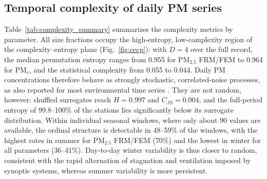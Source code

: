 \documentclass[a4paper,fleqn]{cas-sc}
\begin{document}
\subsection{Temporal complexity of daily PM series}

Table~\ref{tab:complexity_summary} summarizes the complexity metrics by parameter. All size fractions occupy the high-entropy, low-complexity region of the complexity--entropy plane (Fig.~\ref{fig:cecp}): with $D=4$ over the full record, the median permutation entropy ranges from 0.955 for PM$_{2.5}$ FRM/FEM to 0.964 for PM$_{c}$, and the statistical complexity from 0.055 to 0.044. Daily PM concentrations therefore behave as strongly stochastic, correlated-noise processes, as also reported for most environmental time series \citep{Amato2020, Nikolopoulos2021, Ribeiro2017}. They are not random, however: shuffled surrogates reach $H=0.997$ and $C_{JS}=0.004$, and the full-period entropy of 99.8--100\% of the stations lies significantly below its surrogate distribution. Within individual seasonal windows, where only about 90 values are available, the ordinal structure is detectable in 48--59\% of the windows, with the highest rates in summer for PM$_{2.5}$ FRM/FEM (70\%) and the lowest in winter for all parameters (36--41\%). Day-to-day winter variability is thus closer to random, consistent with the rapid alternation of stagnation and ventilation imposed by synoptic systems, whereas summer variability is more persistent.
\end{document}
